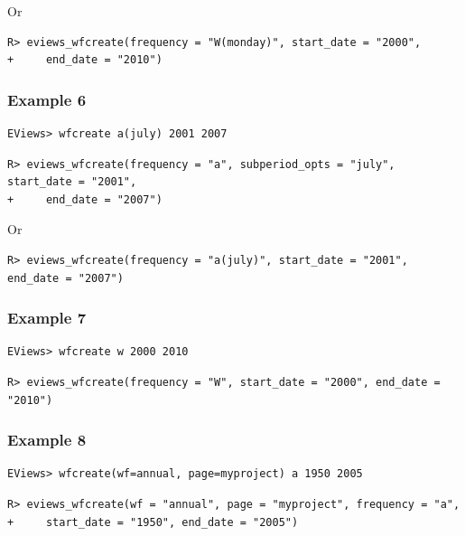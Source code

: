 Or

\begin{verbatim}
R> eviews_wfcreate(frequency = "W(monday)", start_date = "2000",
+     end_date = "2010")
\end{verbatim}

\hypertarget{example-6-2}{%
\subsubsection{Example 6}\label{example-6-2}}

\begin{verbatim}
EViews> wfcreate a(july) 2001 2007
\end{verbatim}

\begin{verbatim}
R> eviews_wfcreate(frequency = "a", subperiod_opts = "july", start_date = "2001",
+     end_date = "2007")
\end{verbatim}

Or

\begin{verbatim}
R> eviews_wfcreate(frequency = "a(july)", start_date = "2001", end_date = "2007")
\end{verbatim}

\hypertarget{example-7-2}{%
\subsubsection{Example 7}\label{example-7-2}}

\begin{verbatim}
EViews> wfcreate w 2000 2010
\end{verbatim}

\begin{verbatim}
R> eviews_wfcreate(frequency = "W", start_date = "2000", end_date = "2010")
\end{verbatim}

\hypertarget{example-8-2}{%
\subsubsection{Example 8}\label{example-8-2}}

\begin{verbatim}
EViews> wfcreate(wf=annual, page=myproject) a 1950 2005
\end{verbatim}

\begin{verbatim}
R> eviews_wfcreate(wf = "annual", page = "myproject", frequency = "a",
+     start_date = "1950", end_date = "2005")
\end{verbatim}

